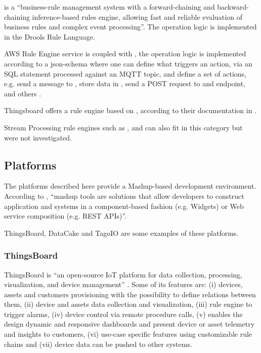  is a ``business-rule management system with a forward-chaining and backward-chaining inference-based rules engine, allowing fast and reliable evaluation of business rules and complex event processing''. The operation logic is implemented in the Drools Rule Language.

AWS Rule Engine service is coupled with , the operation logic is implemented according to a json-schema where one can define what triggers an action, via an \gls{SQL} statement processed against an \gls{MQTT} topic, and define a set of actions, e.g. send a message to , store data in , send a POST request to and endpoint, and others \parencite{aws-rules}.

Thingsboard offers a rule engine based on , according to their documentation in .

Stream Processing rule engines such as ,  and  can also fit in this category but were not investigated.

\subsection{Platforms}
\label{subsec:stateofart:arch:platforms}

The platforms described here provide a Mashup-based development environment. According to \cite{DIAS2022100529}, ``mashup tools are solutions that allow developers to construct application and systems in a component-based fashion (e.g. Widgets) or Web service composition (e.g. REST APIs)''.

ThingsBoard, DataCake and TagoIO are some examples of these platforms.

\subsubsection{ThingsBoard}
\label{subsubsec:stateofart:arch:platforms:thingsboard}

ThingsBoard is ``an open-source IoT platform for data collection, processing, visualization, and device management'' \parencite{thingsboard}. Some of its features are: (i) devices, assets and customers provisioning with the possibility to define relations between them, (ii) device and assets data collection and visualization, (iii) rule engine to trigger alarms, (iv) device control via remote procedure calls, (v) enables the design dynamic and responsive dashboards and present device or asset telemetry and insights to customers, (vi) use-case specific features using customizable rule chains and (vii) device data can be pushed to other systems.

